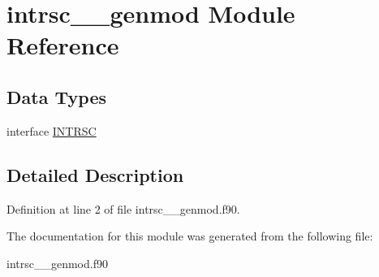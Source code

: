 \hypertarget{classintrsc____genmod}{\section{intrsc\+\_\+\+\_\+genmod Module Reference}
\label{classintrsc____genmod}
}
\subsection*{Data Types}
\begin{DoxyCompactItemize}
\item 
interface \hyperlink{interfaceintrsc____genmod_1_1_i_n_t_r_s_c}{I\+N\+T\+R\+S\+C}
\end{DoxyCompactItemize}


\subsection{Detailed Description}


Definition at line 2 of file intrsc\+\_\+\+\_\+genmod.\+f90.



The documentation for this module was generated from the following file\+:\begin{DoxyCompactItemize}
\item 
intrsc\+\_\+\+\_\+genmod.\+f90\end{DoxyCompactItemize}
